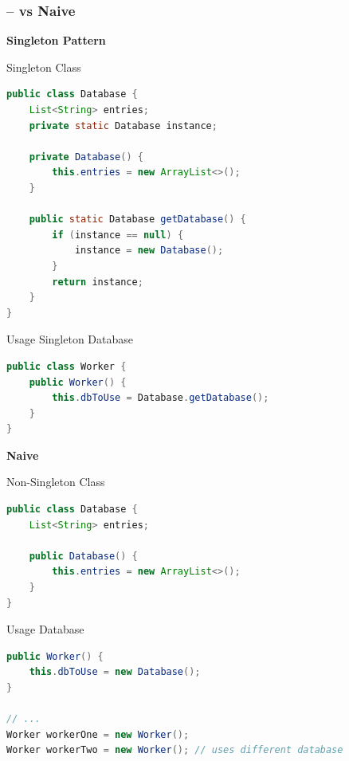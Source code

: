 \begin{frame}[fragile]
	\frametitle{\insertsubsection{} -- vs Naive}
	\begin{fancycolumns}[widths={50,50}, t]
		\centering \textbf{Singleton Pattern}
		\begin{example}{Singleton Class}
			\vspace{-3mm}
			\begin{lstlisting}[language=Java, basicstyle=\footnotesize]
public class Database {
    List<String> entries;
    private static Database instance;

    private Database() {
        this.entries = new ArrayList<>();
    }

    public static Database getDatabase() {
        if (instance == null) {
            instance = new Database();
        }
        return instance;
    }    
}
			\end{lstlisting}
			\vspace{-3mm}
		\end{example}
		\begin{example}{Usage Singleton Database}
			\vspace{-3mm}
			\begin{lstlisting}[language=Java, basicstyle=\small]
public class Worker {
	public Worker() {
        this.dbToUse = Database.getDatabase();
    }
}
			\end{lstlisting}
			\vspace{-3mm}
		\end{example}
		\nextcolumn
		\centering \textbf{Naive}
		\begin{example}{Non-Singleton Class}
			\vspace{-3mm}
			\begin{lstlisting}[language=Java, basicstyle=\footnotesize]
public class Database {
    List<String> entries;

    public Database() {
        this.entries = new ArrayList<>();
    }
}
		\end{lstlisting}
			\vspace{-3mm}
		\end{example}
		\begin{example}{Usage Database}
			\vspace{-3mm}
			\begin{lstlisting}[language=Java, basicstyle=\footnotesize]
public Worker() {
	this.dbToUse = new Database();
}

// ...
Worker workerOne = new Worker();
Worker workerTwo = new Worker(); // uses different database
		\end{lstlisting}
			\vspace{-3mm}
		\end{example}
	\end{fancycolumns}
\end{frame}

